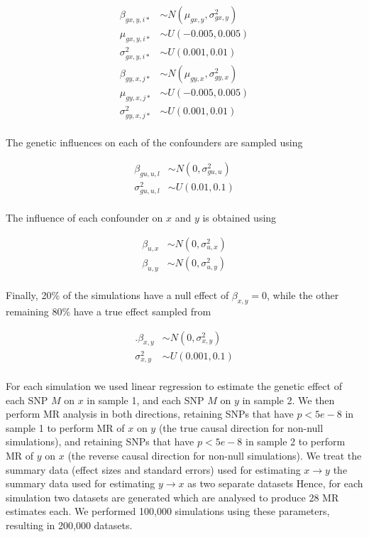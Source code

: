 \documentclass[]{article}
\begin{document}
\[
\begin{aligned}
\beta_{gx,y,i*} & \sim N(\mu_{gx,y}, \sigma^2_{gx,y})  \\
\mu_{gx,y,i*} & \sim U(-0.005, 0.005) \\
\sigma^2_{gx,y,i*} & \sim U(0.001, 0.01) \\
\beta_{gy,x,j*} & \sim N(\mu_{gy,x}, \sigma^2_{gy,x}) \\
\mu_{gy,x,j*} & \sim U(-0.005, 0.005) \\
\sigma^2_{gy,x,j*} & \sim U(0.001, 0.01) \\
\end{aligned}
\]

The genetic influences on each of the confounders are sampled using

\[
\begin{aligned}
\beta_{gu,u,l} & \sim N(0, \sigma^2_{gu,u}) \\
\sigma^2_{gu,u,l} & \sim U(0.01, 0.1) \\
\end{aligned}
\]

The influence of each confounder on \(x\) and \(y\) is obtained using

\[
\begin{aligned}
\beta_{u,x} & \sim N(0, \sigma^{2}_{u,x}) \\
\beta_{u,y} & \sim N(0, \sigma^{2}_{u,y}) \\
\end{aligned}
\]

Finally, 20\% of the simulations have a null effect of
\(\beta_{x,y} = 0\), while the other remaining 80\% have a true effect
sampled from

\[
\begin{aligned}.
\beta_{x,y} & \sim N(0, \sigma^2_{x,y}) \\
\sigma^2_{x,y} & \sim U(0.001, 0.1) \\
\end{aligned}
\]

For each simulation we used linear regression to estimate the genetic
effect of each SNP \(M\) on \(x\) in sample 1, and each SNP \(M\) on
\(y\) in sample 2. We then perform MR analysis in both directions,
retaining SNPs that have \(p < 5e-8\) in sample 1 to perform MR of \(x\)
on \(y\) (the true causal direction for non-null simulations), and
retaining SNPs that have \(p < 5e-8\) in sample 2 to perform MR of \(y\)
on \(x\) (the reverse causal direction for non-null simulations). We
treat the summary data (effect sizes and standard errors) used for
estimating \(x \rightarrow y\) the summary data used for estimating
\(y \rightarrow x\) as two separate datasets Hence, for each simulation
two datasets are generated which are analysed to produce 28 MR estimates
each. We performed 100,000 simulations using these parameters, resulting
in 200,000 datasets.
\end{document}
